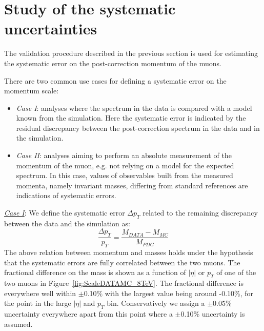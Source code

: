 \section{Study of the systematic uncertainties}
\label{sec:systematics}
The validation procedure described in the previous section is used for
estimating the systematic error on the post-correction momentum of the muons.

There are two common use cases for defining a systematic
error on the momentum scale: 
\begin{itemize}
\item {\sl Case I}: analyses where the spectrum in the data is compared
  with a model known from the simulation. Here the systematic error is
  indicated by the residual
  discrepancy between the post-correction
  spectrum in the data and in the simulation.
\item {\sl Case II}: analyses aiming to perform an absolute measurement of the
  momentum of the muon, e.g. not relying on a model for the
  expected spectrum. In this case, values of observables built from the measured
  momenta, namely invariant masses, differing from standard
  references are indications of systematic errors. 
\end{itemize}

\underline{\sl Case I}: We define the systematic error  $\Delta p_T$ related to the remaining discrepancy between
the data and the simulation as:
\begin{equation}
  \frac{\Delta p_T}{p_T}=\frac{M_{DATA}-M_{MC}}{M_{PDG}}
  \label{eq:syst_DATA_MC}
\end{equation}
The above relation between momentum
and masses holds under the hypothesis that the systematic errors are fully correlated between the two muons. 
The fractional difference on the mass is shown as a function of $|\eta|$ or $p_T$ of one of the two muons in
Figure~\ref{fig:ScaleDATAMC_8TeV}.
The fractional difference is everywhere well within $\pm$0.10\% with the largest value
being around -0.10\%, for the point in the large $|\eta|$ and $p_T$ bin.
Conservatively we assign a $\pm$0.05\% uncertainty everywhere apart from this
point where a $\pm$0.10\% uncertainty is assumed. 

